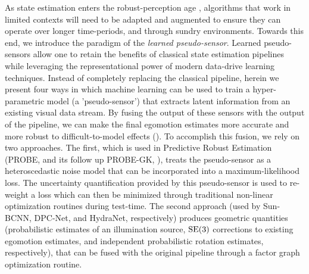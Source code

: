 As state estimation enters the robust-perception age \citep{Cadena2016-ds}, algorithms that work in limited contexts will need to be adapted and augmented to ensure they can operate over longer time-periods, and through sundry environments. Towards this end, we introduce the paradigm of the \textit{learned pseudo-sensor}. Learned pseudo-sensors allow one to retain the benefits of classical state estimation pipelines while leveraging the representational power of modern data-drive learning techniques. Instead of completely replacing the classical pipeline, herein we present four ways in which machine learning can be used to train a hyper-parametric model (a 'pseudo-sensor') that extracts latent information from an existing visual data stream. By fusing the output of these sensors with the output of the pipeline, we can make the final egomotion estimates more accurate and more robust to difficult-to-model effects (). To accomplish this fusion, we rely on two approaches. The first, which is used in Predictive Robust Estimation (PROBE, and its follow up PROBE-GK, ), treats the pseudo-sensor as a heteroscedastic noise model that can be incorporated into a maximum-likelihood loss. The uncertainty quantification provided by this pseudo-sensor is used to re-weight a loss which can then be minimized through traditional non-linear optimization routines during test-time. The second approach (used by Sun-BCNN, DPC-Net, and HydraNet,   respectively) produces geometric quantities (probabilistic estimates of an illumination source, $\mathrm{SE}(3)$ corrections to existing egomotion estimates, and independent probabilistic rotation estimates, respectively), that can be fused with the original pipeline through a factor graph optimization routine.


